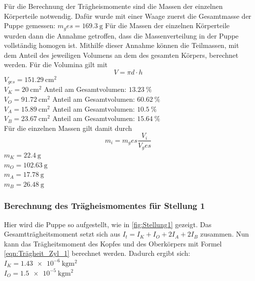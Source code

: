     Für die Berechnung der Trägheismomente sind die Massen der einzelnen Körperteile notwendig.
    Dafür wurde mit einer Waage zuerst die Gesamtmasse der Puppe gemessen: $m_ges=\qty{169.3}{\gram}$
    Für die Massen der einzelnen Körperteile wurden dann die Annahme getroffen, dass die Massenverteilung in der Puppe vollständig homogen ist.
    Mithilfe dieser Annahme können die Teilmassen, mit dem Anteil des jeweiligen Volumens an dem des gesamten Körpers, berechnet werden.
    Für die Volumina gilt mit 
    \begin{equation}
      V=\pi d\cdot h
      \label{eqn:volumen}
    \end{equation}
    $V_{ges}=\qty{151.29}{\centi\meter\squared}$\\
    $V_K=\qty{20}{\centi\meter\squared}$ Anteil am Gesamtvolumen: $\qty{13.23}{\percent}$\\
    $V_O=\qty{91.72}{\centi\meter\squared}$ Anteil am Gesamtvolumen: $\qty{60.62}{\percent}$\\
    $V_A=\qty{15.89}{\centi\meter\squared}$ Anteil am Gesamtvolumen: $\qty{10.5}{\percent}$\\
    $V_B=\qty{23.67}{\centi\meter\squared}$ Anteil am Gesamtvolumen: $\qty{15.64}{\percent}$\\

    Für die einzelnen Massen gilt damit durch 
    \begin{equation}
      m_i=m_ges \frac{V_i}{V_ges}
    \end{equation}
    $m_K=\qty{22.4}{\gram}$\\
    $m_O=\qty{102.63}{\gram}$\\
    $m_A=\qty{17.78}{\gram}$\\
    $m_B=\qty{26.48}{\gram}$\\

    \subsubsection{Berechnung des Trägheismomentes für Stellung 1}
    Hier wird die Puppe so aufgestellt, wie in \ref{fig:Stellung1} gezeigt.%
    Das Gesamtträgheitsmoment setzt sich aus $I_{t}=I_K+I_O+2I_A+2I_B$ zusammen.
    Nun kann das Trägheitsmoment des Kopfes und des Oberkörpers mit Formel \ref{eqn:Trägheit_Zyl_1} berechnet werden.
    Dadurch ergibt sich:\\
    $I_K=\qty{1.43e-6}{\kilo\gram\meter\squared}$\\
    $I_O=\qty{1.5e-5}{\kilo\gram\meter\squared}$\\
    
